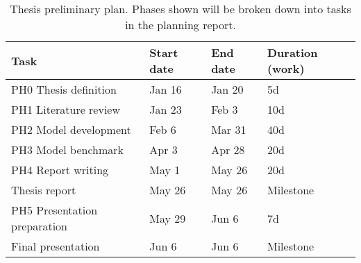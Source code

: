 \documentclass[a4paper,fontsize=10pt,bibliography=totoc]{scrartcl}
\begin{document}
\begin{table}[h!]
\centering
\footnotesize
\caption{Thesis preliminary plan. Phases shown will be broken down into tasks in the planning report.}
\label{t:schedule}
\begin{tabular}{llll}
\toprule
Task                         & Start date & End date & Duration (work) \\ \midrule
PH0 Thesis definition        & Jan 16     & Jan 20   & 5d              \\
PH1 Literature review        & Jan 23     & Feb 3    & 10d             \\
PH2 Model development        & Feb 6      & Mar 31   & 40d             \\
PH3 Model benchmark          & Apr 3      & Apr 28   & 20d             \\
PH4 Report writing           & May 1      & May 26   & 20d             \\
Thesis report                & May 26     & May 26   & Milestone       \\
PH5 Presentation preparation & May 29     & Jun 6    & 7d              \\
Final presentation           & Jun 6      & Jun 6    & Milestone       \\ \bottomrule
\end{tabular}
\end{table}
\end{document}

